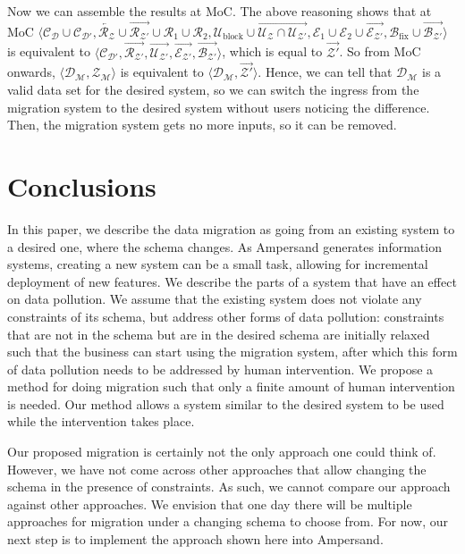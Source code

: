 \documentclass[runningheads]{llncs}
\newcommand{\pair}[2]{\langle{#1},{#2}\rangle}
\newcommand{\concepts}{\mathcal{C}}
\newcommand{\rels}{\mathcal{R}}   %
\newcommand{\rules}{\mathcal{U}}
\newcommand{\transactions}{\mathcal{E}}
\newcommand{\busConstraints}{\mathcal{B}}
\newcommand{\dataset}{\mathscr{D}}
\newcommand{\schema}{\mathscr{Z}}
\newcommand{\migrsys}{\mathscr{M}}
\begin{document}
   Now we can assemble the results at MoC.
   The above reasoning shows that at MoC
   $\langle\concepts_\dataset\cup\concepts_{\dataset'},
   \overleftarrow{\rels_{\schema}}\cup\overrightarrow{\rels_{\schema'}}\cup\rels_1\cup\rels_2,
   \rules_\text{block}\cup\overrightarrow{\rules_{\schema}\cap\rules_{\schema'}},
   \transactions_1\cup\transactions_2\cup\overrightarrow{\transactions_{\schema'}},
   \busConstraints_\text{fix}\cup\overrightarrow{\busConstraints_{\schema'}}\rangle$ is equivalent to 
   $\langle\concepts_{\dataset'}, \overrightarrow{\rels_{\schema'}}, \overrightarrow{\rules_{\schema'}}, \overrightarrow{\transactions_{\schema'}}, \overrightarrow{\busConstraints_{\schema'}}\rangle$,
   which is equal to $\overrightarrow{\schema'}$.
   So from MoC onwards, $\pair{\dataset_{\migrsys}}{\schema_{\migrsys}}$ is equivalent to $\pair{\dataset_{\migrsys}}{\overrightarrow{\schema'}}$.
   Hence, we can tell that $\dataset_{\migrsys}$ is a valid data set for the desired system, so we can switch the ingress from the migration system to the desired system without users noticing the difference.
   Then, the migration system gets no more inputs, so it can be removed. 

\section{Conclusions}
\label{sct:Conclusions}
   In this paper, we describe the data migration as going from an existing system to a desired one, where the schema changes.
   As Ampersand generates information systems, creating a new system can be a small task, allowing for incremental deployment of new features.
   We describe the parts of a system that have an effect on data pollution.
   We assume that the existing system does not violate any constraints of its schema, but address other forms of data pollution:
   constraints that are not in the schema but are in the desired schema are initially relaxed such that the business can start using the migration system, after which this form of data pollution needs to be addressed by human intervention.
   We propose a method for doing migration such that only a finite amount of human intervention is needed.
   Our method allows a system similar to the desired system to be used while the intervention takes place.

   Our proposed migration is certainly not the only approach one could think of.
   However, we have not come across other approaches that allow changing the schema in the presence of constraints.
   As such, we cannot compare our approach against other approaches.
   We envision that one day there will be multiple approaches for migration under a changing schema to choose from.
   For now, our next step is to implement the approach shown here into Ampersand.
\end{document}
